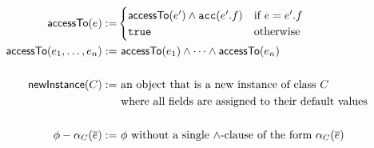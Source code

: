 \begin{spacing}{1.5}
\begin{align*}
\textsf{accessTo}(e) := & \begin{cases}
  \textsf{accessTo}(e^\prime) \land \texttt{acc}(e^\prime.f) & \text{if} \ e = e^\prime.f \\
  \texttt{true} & \text{otherwise}
\end{cases}
\\
\textsf{accessTo}(e_1, \dots, e_n) :=
  & \ \textsf{accessTo}(e_1) \land \cdots \land \textsf{accessTo}(e_n)
\\
\\
\textsf{newInstance}(C) :=
  & \ \text{an object that is a new instance of class $C$} \\
  & \ \text{where all fields are assigned to their default values}
\\
\\
\phi - \alpha_C(\overline{e}) :=
  & \ \phi \ \text{without a single $\land$-clause of the form} \ \alpha_C(\overline{e})
\end{align*}
\end{spacing}
